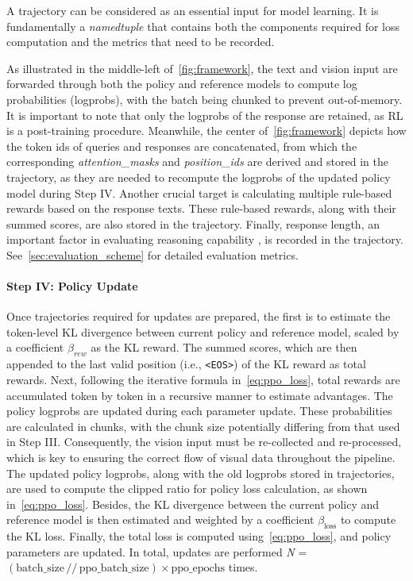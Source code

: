 \documentclass{article} %
\begin{document}
A trajectory can be considered as an essential input for model learning.
%
It is fundamentally a \textit{namedtuple} that contains both the components required for loss computation and the metrics that need to be recorded.

As illustrated in the middle-left of~\cref{fig:framework}, the text and vision input are forwarded through both the policy and reference models to compute log probabilities (logprobs), with the batch being chunked to prevent out-of-memory.
%
It is important to note that only the logprobs of the response are retained, as RL is a post-training procedure.
%
Meanwhile, the center of~\cref{fig:framework} depicts how the token ids of queries and responses are concatenated, from which the corresponding \textit{attention\_masks} and \textit{position\_ids} are derived and stored in the trajectory, as they are needed to recompute the logprobs of the updated policy model during Step IV.
%
Another crucial target is calculating multiple rule-based rewards based on the response texts.
%
These rule-based rewards, along with their summed scores, are also stored in the trajectory. 
%
Finally, response length, an important factor in evaluating reasoning capability \citep{guo2025deepseekR1}, is recorded in the trajectory. See~\cref{sec:evaluation_scheme} for detailed evaluation metrics.

\paragraph{Step IV: Policy Update}

Once trajectories required for updates are prepared, the first is to estimate the token-level KL divergence between current policy and reference model, scaled by a coefficient $\beta_{rew}$ as the KL reward.  
%
The summed scores, which are then appended to the last valid position (i.e., \texttt{<EOS>}) of the KL reward as total rewards.  
%
Next, following the iterative formula in~\cref{eq:ppo_loss}, total rewards are accumulated token by token in a recursive manner to estimate advantages. %
The policy logprobs are updated during each parameter update. These probabilities are calculated in chunks, with the chunk size potentially differing from that used in Step III. Consequently, the vision input must be re-collected and re-processed, which is key to ensuring the correct flow of visual data throughout the pipeline.
%
The updated policy logprobs, along with the old logprobs stored in trajectories, are used to compute the clipped ratio for policy loss calculation, as shown in~\cref{eq:ppo_loss}.
%
Besides, the KL divergence between the current policy and reference model is then estimated and weighted by a coefficient $\beta_{\text{loss}}$ to compute the KL loss.  
%
Finally, the total loss is computed using~\cref{eq:ppo_loss}, and policy parameters are updated. 
%
In total, updates are performed \textit{N} = \((\text{batch\_size} \,//\, \text{ppo\_batch\_size}) \times \text{ppo\_epochs}\) times.  
\end{document}
